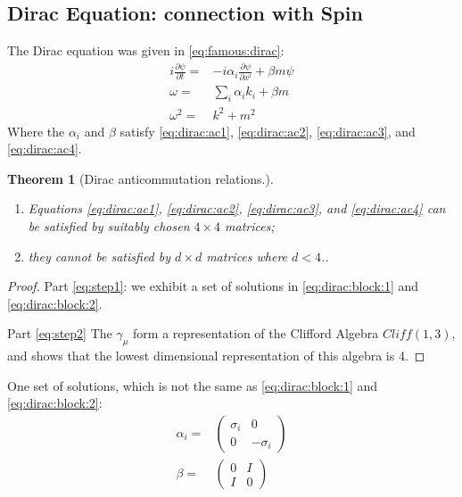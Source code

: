 \documentclass[]{article}
\newtheorem{thm}{Theorem}
\begin{document}
\subsection{Dirac Equation: connection with Spin}

The Dirac equation was given in \eqref{eq:famous:dirac}:
\begin{align*}
	i \frac{\partial \psi}{\partial t} =& - i \alpha_i \frac{\partial \psi}{\partial x^i} + \beta m \psi\\
	\omega =& \sum_i \alpha_i k_i + \beta m\\
	\omega^2 =& k^2 + m^2
\end{align*}
Where the $\alpha_i$ and $\beta$ satisfy \eqref{eq:dirac:ac1}, \eqref{eq:dirac:ac2}, \eqref{eq:dirac:ac3}, and \eqref{eq:dirac:ac4}.

\begin{thm}[Dirac anticommutation relations.]\label{thm:dirac:anticommutation} 
	\begin{enumerate}
		\item Equations \eqref{eq:dirac:ac1}, \eqref{eq:dirac:ac2}, \eqref{eq:dirac:ac3}, and \eqref{eq:dirac:ac4} can be satisfied by suitably chosen $4\times4$ matrices\label{eq:step1};
		\item  they cannot be satisfied by $d \times d$ matrices where $d < 4$.\label{eq:step2}.
	\end{enumerate}
\end{thm}
\begin{proof}
	 Part \ref{eq:step1}: we exhibit a set of solutions in \eqref{eq:dirac:block:1} and \eqref{eq:dirac:block:2}.
	 
	 Part \ref{eq:step2} The $\gamma_{\mu}$ form a representation of the Clifford Algebra $Cliff(1,3)$, and \cite{randy2024matrix} shows that the lowest dimensional representation of this algebra is 4.
\end{proof}

One set of solutions, which is not the same as \eqref{eq:dirac:block:1} and \eqref{eq:dirac:block:2}:
\begin{align*}
	\alpha_i=&\begin{pmatrix}
		\sigma_i&0\\
		0&-\sigma_i
	\end{pmatrix}\\
	\beta =& \begin{pmatrix}
		0&I\\
		I&0
	\end{pmatrix}
\end{align*}
\end{document}
